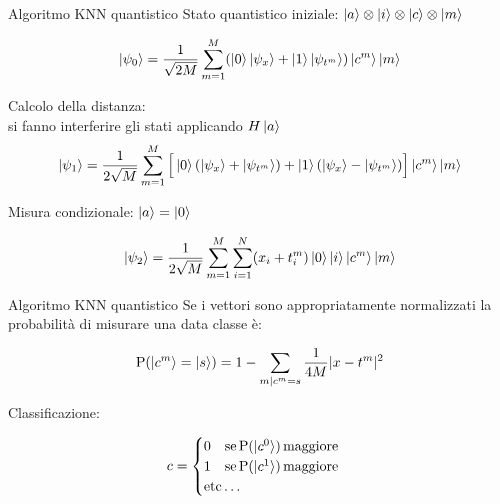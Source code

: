 \documentclass{beamer}
\begin{document}
    \begin{frame}{Algoritmo KNN quantistico}
        Stato quantistico iniziale: $\ket{a} \otimes \ket{i} \otimes \ket{c} \otimes \ket{m}$

		\begin{equation*}
			\ket{\psi_0} = \frac{1}{\sqrt{2M}} \sum_{m=1}^M 
			(\ket{0}\ket{\psi_x}+\ket{1}\ket{\psi_{t^m}})\ket{c^m}\ket{m}
		\end{equation*}

		Calcolo della distanza: \\ si fanno interferire gli stati applicando $H\ket{a}$
		\begin{equation*}
			\ket{\psi_1} = \frac{1}{2\sqrt{M}}\sum_{m=1}^M 
			\Big[ \ket{0}(\ket{\psi_x}+\ket{\psi_{t^m}}) + \ket{1}(\ket{\psi_x}-\ket{\psi_{t^m}}) \Big] \ket{c^m}\ket{m}
		\end{equation*}
	
		Misura condizionale: $\ket{a} = \ket{0}$

		\begin{equation*}
			\ket{\psi_2} = \frac{1}{2\sqrt{M}} \sum_{m=1}^M \sum_{i=1}^N
			(x_i+t_i^m)\ket{0}\ket{i}\ket{c^m}\ket{m}
		\end{equation*}
    \end{frame}

    \begin{frame}{Algoritmo KNN quantistico}
        Se i vettori sono appropriatamente normalizzati 
        la probabilità di misurare una data classe è:

		\begin{equation*}
			\text{P}(\ket{c^m} = \ket{s}) = 1 - \sum_{m|c^m=s} 
			\frac{1}{4M} |x-t^m|^2
		\end{equation*}

		Classificazione:

		\begin{equation*}
			c = \begin{cases}
			0 \quad \text{se}\, \text{P}(\ket{c^0})\, \text{maggiore} \\
			1 \quad \text{se}\, \text{P}(\ket{c^1})\, \text{maggiore} \\
			\text{etc}\ldots
		\end{cases}
        \end{equation*}
    \end{frame}
\end{document}
